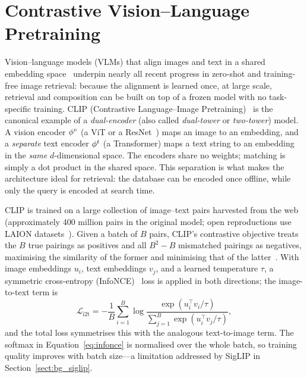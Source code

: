 
\section{Contrastive Vision--Language Pretraining}\label{sect:bg_clip}

Vision--language models (VLMs) that align images and text in a shared embedding
space~\cite{radford2021clip,li2022blip,li2023blip2,jia2021align,zhai2023siglip}
underpin nearly all recent progress in zero-shot and training-free image
retrieval: because the alignment is learned once, at large scale, retrieval and
composition can be built on top of a frozen model with no task-specific
training. CLIP (Contrastive Language--Image Pretraining)~\cite{radford2021clip}
is the canonical example of a \emph{dual-encoder} (also called \emph{dual-tower}
or \emph{two-tower}) model. A vision encoder $\phi^{v}$ (a ViT or a ResNet~\cite{he2016resnet}) maps an
image to an embedding, and a \emph{separate} text encoder $\phi^{t}$ (a
Transformer) maps a text string to an embedding in the \emph{same}
$d$-dimensional space. The encoders share no weights; matching is simply a dot
product in the shared space. This separation is what makes the architecture
ideal for retrieval: the database can be encoded once offline, while only the
query is encoded at search time.

CLIP is trained on a large collection of image--text pairs harvested from the
web (approximately 400 million pairs in the original model; open reproductions
use LAION datasets~\cite{schuhmann2022laion5b,ilharco2021openclip}). Given a
batch of $B$ pairs, CLIP's contrastive objective treats the $B$ true pairings
as positives and all $B^{2}-B$ mismatched pairings as negatives, maximising the
similarity of the former and minimising that of the
latter~\cite{radford2021clip}. With image embeddings $u_{i}$, text embeddings
$v_{j}$, and a learned temperature $\tau$, a symmetric cross-entropy
(InfoNCE)~\cite{radford2021clip} loss is applied in both directions; the
image-to-text term is
\begin{equation}\label{eq:infonce}
  \mathcal{L}_{\mathrm{i2t}}
  = -\frac{1}{B}\sum_{i=1}^{B}
    \log\frac{\exp(u_{i}^{\top}v_{i}/\tau)}
             {\sum_{j=1}^{B}\exp(u_{i}^{\top}v_{j}/\tau)},
\end{equation}
and the total loss symmetrises this with the analogous text-to-image term. The
softmax in Equation~\eqref{eq:infonce} is normalised over the whole batch, so
training quality improves with batch size---a limitation addressed by SigLIP in
Section~\ref{sect:bg_siglip}.

